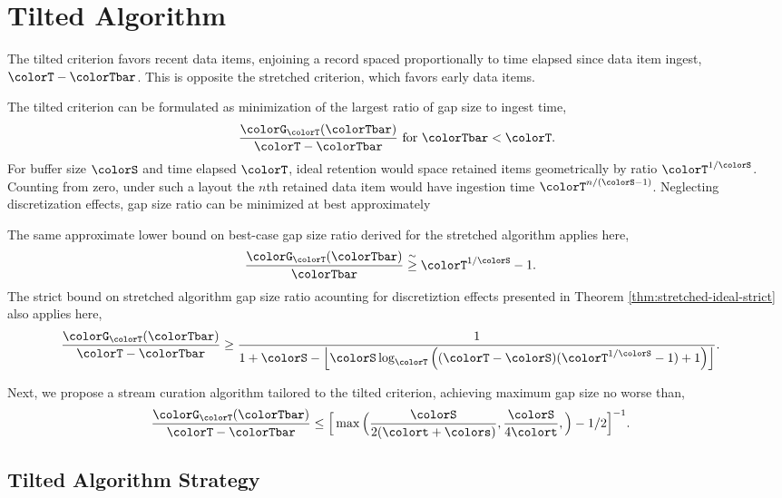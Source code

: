 \section{Tilted Algorithm} \label{sec:tilted}

The tilted criterion favors recent data items, enjoining a record spaced proportionally to time elapsed since data item ingest, $\colorT - \colorTbar$.
This is opposite the stretched criterion, which favors early data items.

The tilted criterion can be formulated as minimization of the largest ratio of gap size to ingest time,
\begin{align*}
\frac{\colorG_{\colorT}(\colorTbar)}{\colorT - \colorTbar} \text{ for } \colorTbar < \colorT.
\end{align*}
For buffer size $\colorS$ and time elapsed $\colorT$, ideal retention would space retained items geometrically by ratio $\colorT^{1/\colorS}$.
Counting from zero, under such a layout the $n$th retained data item would have ingestion time $\colorT^{n/(\colorS - 1)}$.
Neglecting discretization effects, gap size ratio can be minimized at best approximately

The same approximate lower bound on best-case gap size ratio derived for the stretched algorithm applies here,
\begin{align*}
\frac{\colorG_{\colorT}(\colorTbar)}{\colorTbar}
&\stackrel{\sim}{\geq}
\colorT^{1/\colorS} - 1.
\end{align*}
The strict bound on stretched algorithm gap size ratio acounting for discretiztion effects presented in Theorem \ref{thm:stretched-ideal-strict} also applies here,
\begin{align*}
\frac{\colorG_{\colorT}(\colorTbar)}{\colorT - \colorTbar}
&\geq
\frac{
  1
}{
  1 + \colorS
  - \left\lfloor \colorS \log_{\colorT}\Big(
    (\colorT - \colorS)(\colorT^{1/\colorS} - 1) + 1
  \Big)\right\rfloor
}.
\end{align*}

Next, we propose a stream curation algorithm tailored to the tilted criterion, achieving maximum gap size no worse than,
\begin{align*}
  \frac{\colorG_{\colorT}(\colorTbar)}{\colorT - \colorTbar}
  &\leq
  \Big[
    \max\Big(
      \frac{\colorS}{2(\colort + \colors)},
      \frac{\colorS}{4\colort},
    \Big)
    - 1/2
  \Big]^{-1}.
\end{align*}

\subsection{Tilted Algorithm Strategy}
\label{sec:tilted-strategy}

